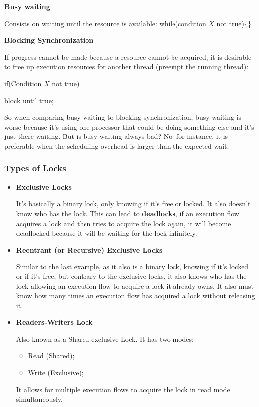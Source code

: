     \par \textbf{Busy waiting}
    \par Consists on waiting until the resource is available: while(condition $X$ not true)\{\}
    \par \textbf{Blocking Synchronization}
    \par If progress cannot be made because a resource cannot be acquired, it is desirable to free up execution resources for another thread (preempt the running thread):
    \par if(Condition $X$ not true)
    \par \quad block until true;
    \par So when comparing busy waiting to blocking synchronization, busy waiting is worse because it's using one processor that could be doing something else and it's just there waiting. But is busy waiting always bad? No, for instance, it is preferable when the scheduling overhead is larger than the expected wait.
\clearpage
    \subsubsection{Types of Locks}
    \begin{itemize}
        \item \par {\Large \textbf{Exclusive Locks}}
        \par It's basically a binary lock, only knowing if it's free or locked. It also doesn't know who has the lock. This can lead to \textbf{deadlocks}, if an execution flow acquires a lock and then tries to acquire the lock again, it will become deadlocked because it will be waiting for the lock infinitely.
        \item \par {\Large \textbf{Reentrant (or Recursive) Exclusive Locks}}
        \par Similar to the last example, as it also is a binary lock, knowing if it's locked or if it's free, but contrary to the exclusive locks, it also knows who has the lock allowing an execution flow to acquire a lock it already owns. It also must know how many times an execution flow has acquired a lock without releasing it.
        \item \par {\Large \textbf{Readers-Writers Lock}}
        \par Also known as a Shared-exclusive Lock. It has two modes:
        \begin{itemize}
            \item Read (Shared);
            \item Write (Exclusive);
        \end{itemize}
        \par It allows for multiple execution flows to acquire the lock in read mode simultaneously.
    \end{itemize}
